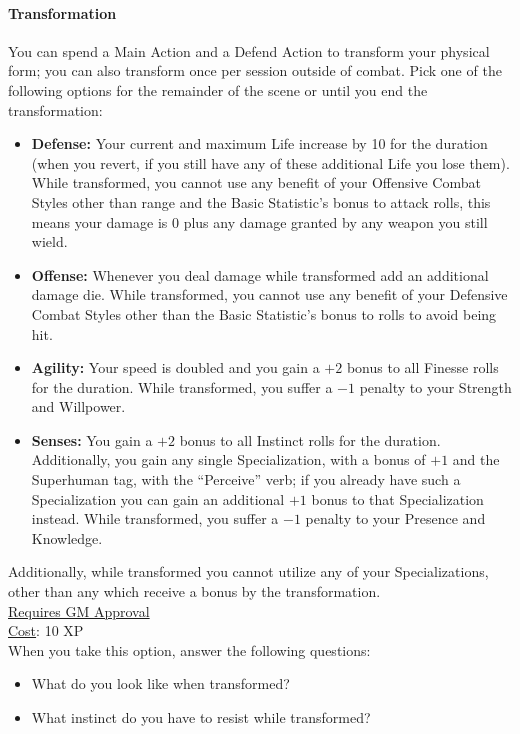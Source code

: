 \paragraph{Transformation}
You can spend a Main Action and a Defend Action to transform your physical form; you can also transform once per session outside of combat.
Pick one of the following options for the remainder of the scene or until you end the transformation:
\begin{itemize}
  \item \textbf{Defense:} Your current and maximum Life increase by 10 for the duration (when you revert, if you still have any of these additional Life you lose them).
    While transformed, you cannot use any benefit of your Offensive Combat Styles other than range and the Basic Statistic's bonus to attack rolls, this means your damage is 0 plus any damage granted by any weapon you still wield.
  \item \textbf{Offense:} Whenever you deal damage while transformed add an additional damage die.
    While transformed, you cannot use any benefit of your Defensive Combat Styles other than the Basic Statistic's bonus to rolls to avoid being hit.
  \item \textbf{Agility:} Your speed is doubled and you gain a $+2$ bonus to all Finesse rolls for the duration.
    While transformed, you suffer a $-1$ penalty to your Strength and Willpower.
  \item \textbf{Senses:} You gain a $+2$ bonus to all Instinct rolls for the duration.
    Additionally, you gain any single Specialization, with a bonus of $+1$ and the Superhuman tag, with the ``Perceive'' verb; if you already have such a Specialization you can gain an additional $+1$ bonus to that Specialization instead.
    While transformed, you suffer a $-1$ penalty to your Presence and Knowledge.
\end{itemize}
Additionally, while transformed you cannot utilize any of your Specializations, other than any which receive a bonus by the transformation.
\\[.5cm]
\underline{Requires GM Approval}
\\
\underline{Cost}: 10 XP
\\
When you take this option, answer the following questions:
\begin{itemize}
  \item What do you look like when transformed?
  \item What instinct do you have to resist while transformed?
\end{itemize}
